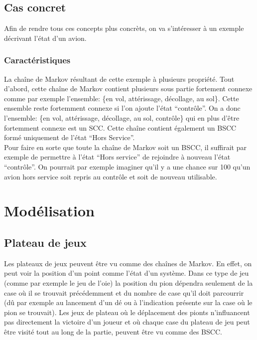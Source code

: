 \documentclass[letterpaper]{article}
\begin{document}
  \subsection{Cas concret}
    \label{casconcret}
    Afin de rendre tous ces concepts plus concrèts, on va s'intéresser à un exemple décrivant
    l'état d'un avion.
    
    \subsubsection{Caractéristiques}
      La chaîne de Markov résultant de cette exemple à plusieurs propriété.  Tout
      d'abord, cette chaîne de Markov contient plusieurs sous partie fortement
      connexe comme par exemple l'ensemble: \{en vol, attérissage, décollage,
      au sol\}.  Cette ensemble reste fortemment connexe si l'on ajoute l'état
      ``contrôle''.  On a donc l'ensemble: \{en vol, attérissage, décollage,
      au sol, contrôle\} qui en plus d'être fortemment connexe est un SCC.
      Cette chaîne contient également un BSCC formé uniquement de l'état 
      ``Hors Service''.\\
      Pour faire en sorte que toute la chaîne de Markov soit un BSCC, il suffirait
      par exemple de permettre à l'état ``Hors service'' de rejoindre à nouveau l'état
      ``contrôle''.  On pourrait par exemple imaginer qu'il y a une chance sur 100 qu'un
      avion hors service soit repris au contrôle et soit de nouveau utilisable.
  
  
\section{Modélisation}

  \subsection{Plateau de jeux}
    Les plateaux de jeux peuvent être vu comme des chaînes de Markov.  En effet, on peut 
    voir la position d'un point comme l'état d'un système.  Dans ce type de jeu (comme 
    par exemple le jeu de l'oie) la position du pion dépendra seulement de la case où il 
    se trouvait précédemment et du nombre de case qu'il doit parcourrir (dû par exemple 
    au lancement d'un dé ou à l'indication présente sur la case où le pion se trouvait).
    Les jeux de plateau où le déplacement des pionts n'influancent pas directement la 
    victoire d'un joueur et où chaque case du plateau de jeu peut être visité tout 
    au long de la partie, peuvent être vu comme des BSCC.  
  
\end{document}
